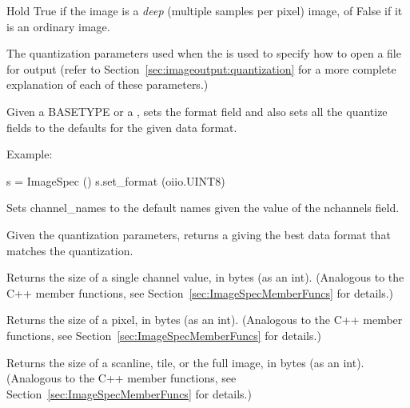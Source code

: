 Hold {\cf True} if the image is a \emph{deep} (multiple samples per pixel)
image, of {\cf False} if it is an ordinary image.
\apiend

The quantization parameters used when the \ImageSpec is used to specify
how to open a file for output (refer to
Section~\ref{sec:imageoutput:quantization} for
a more complete explanation of each of these parameters.)
\apiend

Given a {\cf BASETYPE} or a \TypeDesc, sets the {\cf format} field and
also sets all the {\cf quantize} fields to the defaults for the given
data format.

\noindent Example:
\begin{code}
    s = ImageSpec ()
    s.set_format (oiio.UINT8)
\end{code}
\apiend

Sets {\cf channel_names} to the default names given the value of
the {\cf nchannels} field.
\apiend

Given the quantization parameters, returns a \TypeDesc giving the best
data format that matches the quantization.
\apiend

Returns the size of a single channel value, in bytes (as an
{\cf int}).
(Analogous to the C++ member functions, see 
Section~\ref{sec:ImageSpecMemberFuncs} for details.)
\apiend

Returns the size of a pixel, in bytes (as an {\cf int}).
(Analogous to the C++ member functions, see 
Section~\ref{sec:ImageSpecMemberFuncs} for details.)
\apiend

Returns the size of a scanline, tile, or the full image, in bytes (as an
{\cf int}). (Analogous to the C++ member functions, see 
Section~\ref{sec:ImageSpecMemberFuncs} for details.)
\apiend


